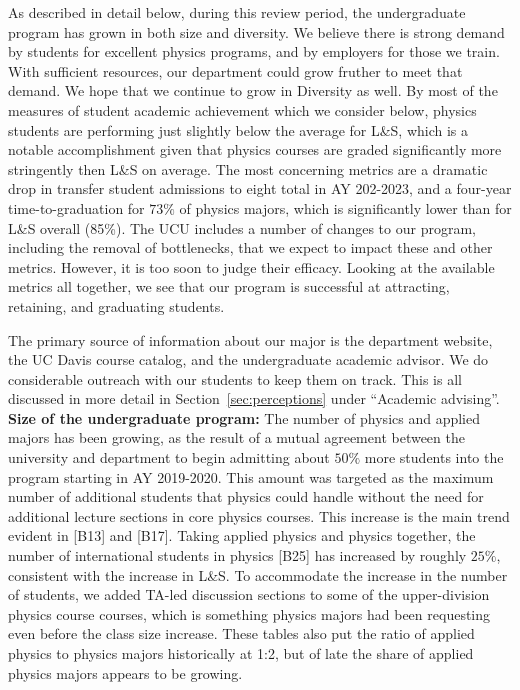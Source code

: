 \documentclass[12pt]{article}
\begin{document}
\noindent

As described in detail below, during this review period, the
undergraduate program has grown in both size and diversity.  We
believe there is strong demand by students for excellent physics
programs, and by employers for those we train.  With sufficient
resources, our department could grow fruther to meet that demand.  We
hope that we continue to grow in Diversity as well.  By most of the
measures of student academic achievement which we consider below,
physics students are performing just slightly below the average for
L\&S, which is a notable accomplishment given that physics courses are
graded significantly more stringently then L\&S on average.  The most
concerning metrics are a dramatic drop in transfer student admissions
to eight total in AY 202-2023, and a four-year time-to-graduation for
$73\%$ of physics majors, which is significantly lower than for L\&S
overall (85\%).  The UCU includes a number of changes to our program,
including the removal of bottlenecks, that we expect to impact these
and other metrics.  However, it is too soon to judge their efficacy.
Looking at the available metrics all together, we see that our program
is successful at attracting, retaining, and graduating students.

The primary source of information about our major is the department
website, the UC Davis course catalog, and the undergraduate academic
advisor.  We do considerable outreach with our students to keep them
on track.  This is all discussed in more detail in
Section~\ref{sec:perceptions} under ``Academic advising''.\\[3pt]

\noindent
{\bf Size of the undergraduate program:} The number of physics and
applied majors has been growing, as the result of a mutual agreement
between the university and department to begin admitting about $50\%$
more students into the program starting in AY 2019-2020.  This amount
was targeted as the maximum number of additional students that physics
could handle without the need for additional lecture sections in core
physics courses.  This increase is the main trend evident in [B13] and
[B17]. Taking applied physics and physics together, the number of
international students in physics [B25] has increased by roughly
$25\%$, consistent with the increase in L\&S.  To accommodate the
increase in the number of students, we added TA-led discussion
sections to some of the upper-division physics course courses, which
is something physics majors had been requesting even before the class
size increase.  These tables also put the ratio of applied physics to
physics majors historically at 1:2, but of late the share of applied
physics majors appears to be growing.\\[3pt]
\end{document}
